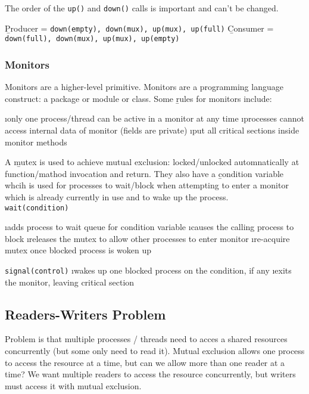 \documentclass{article}
\begin{document}
    The order of the \texttt{up()} and \texttt{down()} calls is important and can't be changed. 

    \begin{center}
        \b{Producer} = \texttt{down(empty), down(mux), up(mux), up(full)}
        \b{Consumer} = \texttt{down(full), down(mux), up(mux), up(empty)}
    \end{center}

    \subsubsection{Monitors}

    Monitors are a higher-level primitive. Monitors are a programming language construct: a package or module or class. Some \b{rules for monitors} include:

    \bl 
    \i only one process/thread can be active in a monitor at any time
    \i processes cannot access internal data of monitor (fields are private)
    \i put all critical sections inside monitor methods
    \el

    \noindent A \b{mutex} is used to achieve mutual exclusion: locked/unlocked automnatically at function/mathod invocation and return. They also have a \b{condition variable} whcih is used for processes to wait/block when attempting to enter a monitor which is already currently in use and to wake up the process. \\

    \noindent \texttt{wait(condition)}

    \bl 
    \i adds process to wait queue for condition variable
    \i causes the calling process to block
    \i releases the mutex to allow other processes to enter monitor 
    \i re-acquire mutex once blocked process is woken up
    \el 

    \noindent \texttt{signal(control)}
    \bl 
    \i wakes up one blocked process on the condition, if any
    \i exits the monitor, leaving critical section
    \el 

\subsection{Readers-Writers Problem}

    Problem is that multiple processes / threads need to acces a shared resources concurrently (but some only need to read it). Mutual exclusion allows one process to access the resource at a time, but can we allow more than one reader at a time? We want multiple readers to access the resource concurrently, but writers must access it with mutual exclusion. 
\end{document}
